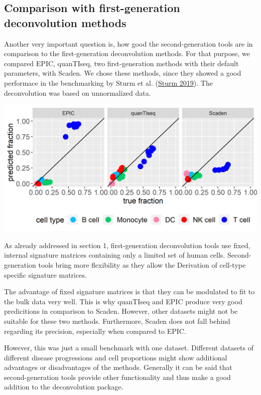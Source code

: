 \documentclass[
]{article}
\begin{document}
\hypertarget{comparison-with-first-generation-deconvolution-methods}{%
\subsection{Comparison with first-generation deconvolution
methods}\label{comparison-with-first-generation-deconvolution-methods}}

Another very important question is, how good the second-generation tools
are in comparison to the first-generation deconvolution methods. For
that purpose, we compared EPIC, quanTIseq, two first-generation methods
with their default parameters, with Scaden. We chose these methods,
since they showed a good performace in the benchmarking by Sturm et al.
(\protect\hyperlink{ref-Sturm2019}{Sturm 2019}). The deconvolution was
based on unnormalized data.

\includegraphics[width=0.8\linewidth]{images/predictionVsGroundtruth_unnormalized_firstGeneration}

As already addressed in section 1, first-generation deconvolution tools
use fixed, internal signature matrices containing only a limited set of
human cells. Second-generation tools bring more flexibility as they
allow the Derivation of cell-type specific signature matrices.

The advantage of fixed signature matrices is that they can be modulated
to fit to the bulk data very well. This is why quanTIseq and EPIC
produce very good predicitions in comparison to Scaden. However, other
datasets might not be suitable for these two methods. Furthermore,
Scaden does not fall behind regarding its precision, especially when
compared to EPIC.

However, this was just a small benchmark with one dataset. Different
datasets of different disease progressions and cell proportions might
show additional advantages or disadvantages of the methods. Generally it
can be said that second-generation tools provide other functionality and
thus make a good addition to the deconvolution package.
\end{document}

